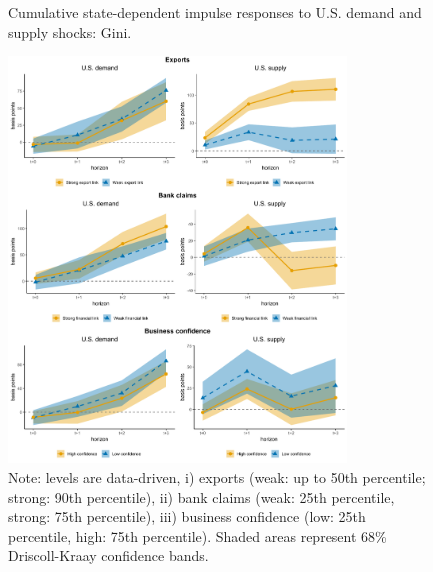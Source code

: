 \documentclass[12pt, a4paper]{article}
\begin{document}
\begin{figure}[H]
    \centering
    \caption{Cumulative state-dependent impulse responses to U.S. demand and supply shocks: Gini.}
    \label{fig:demand_supply_channels_ag}
    \includegraphics[width=0.80\textwidth]{Figures/state_dependent_IRFs}
    \centering \caption*{Note: levels are data-driven, i) exports (weak: up to 50th percentile; strong: 90th percentile), ii) bank claims (weak: 25th percentile, strong: 75th percentile), iii) business confidence (low: 25th percentile, high: 75th percentile). Shaded areas represent 68\% Driscoll-Kraay confidence bands.}
\end{figure}
\end{document}
